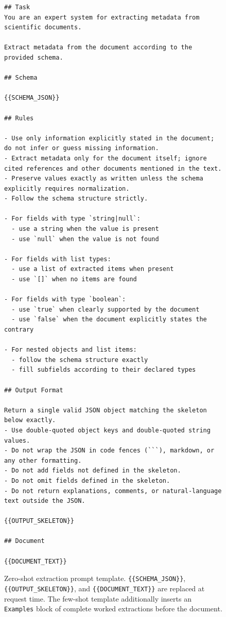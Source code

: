 \begin{figure}[t]
\begin{lstlisting}[style=codeblock,basicstyle=\ttfamily\scriptsize]
## Task
You are an expert system for extracting metadata from scientific documents.

Extract metadata from the document according to the provided schema.

## Schema

{{SCHEMA_JSON}}

## Rules

- Use only information explicitly stated in the document; do not infer or guess missing information.
- Extract metadata only for the document itself; ignore cited references and other documents mentioned in the text.
- Preserve values exactly as written unless the schema explicitly requires normalization.
- Follow the schema structure strictly.

- For fields with type `string|null`:
  - use a string when the value is present
  - use `null` when the value is not found

- For fields with list types:
  - use a list of extracted items when present
  - use `[]` when no items are found

- For fields with type `boolean`:
  - use `true` when clearly supported by the document
  - use `false` when the document explicitly states the contrary

- For nested objects and list items:
  - follow the schema structure exactly
  - fill subfields according to their declared types

## Output Format

Return a single valid JSON object matching the skeleton below exactly.
- Use double-quoted object keys and double-quoted string values.
- Do not wrap the JSON in code fences (```), markdown, or any other formatting.
- Do not add fields not defined in the skeleton.
- Do not omit fields defined in the skeleton.
- Do not return explanations, comments, or natural-language text outside the JSON.

{{OUTPUT_SKELETON}}

## Document

{{DOCUMENT_TEXT}}
\end{lstlisting}
  \caption{Zero-shot extraction prompt template. \texttt{\{\{SCHEMA\_JSON\}\}},
  \texttt{\{\{OUTPUT\_SKELETON\}\}}, and \texttt{\{\{DOCUMENT\_TEXT\}\}} are
  replaced at request time. The few-shot template additionally inserts an
  \texttt{Examples} block of complete worked extractions before the
  document.}
  \label{fig:prompt-template}
\end{figure}
